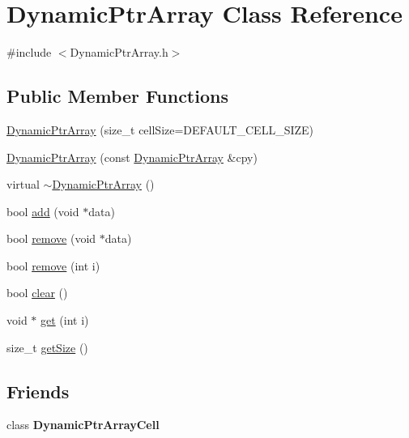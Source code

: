 \hypertarget{class_dynamic_ptr_array}{\section{Dynamic\+Ptr\+Array Class Reference}
\label{class_dynamic_ptr_array}
}


{\ttfamily \#include $<$Dynamic\+Ptr\+Array.\+h$>$}

\subsection*{Public Member Functions}
\begin{DoxyCompactItemize}
\item 
\hyperlink{class_dynamic_ptr_array_a57b0166ab9e49562247106cbaca00eb1}{Dynamic\+Ptr\+Array} (size\+\_\+t cell\+Size=D\+E\+F\+A\+U\+L\+T\+\_\+\+C\+E\+L\+L\+\_\+\+S\+I\+Z\+E)
\item 
\hyperlink{class_dynamic_ptr_array_a73f3b88933927871159cf56ea9c68d39}{Dynamic\+Ptr\+Array} (const \hyperlink{class_dynamic_ptr_array}{Dynamic\+Ptr\+Array} \&cpy)
\item 
virtual \hyperlink{class_dynamic_ptr_array_a075c62d5548fc344033a2a401e5593e0}{$\sim$\+Dynamic\+Ptr\+Array} ()
\item 
bool \hyperlink{class_dynamic_ptr_array_a10474d69e5e4d916c217f2cb4f1fdf79}{add} (void $\ast$data)
\item 
bool \hyperlink{class_dynamic_ptr_array_a1da46005c26dd7d4723ed1535a73d62f}{remove} (void $\ast$data)
\item 
bool \hyperlink{class_dynamic_ptr_array_af7d232f327b4bbd2ec3a9d886edc2907}{remove} (int i)
\item 
bool \hyperlink{class_dynamic_ptr_array_ad08021e4d8bfdc8235499e7b0948b2f0}{clear} ()
\item 
void $\ast$ \hyperlink{class_dynamic_ptr_array_a7e8eca98f7a6400614c6e2296735a956}{get} (int i)
\item 
size\+\_\+t \hyperlink{class_dynamic_ptr_array_a57608e634402b3e16048ad2c1c26e74e}{get\+Size} ()
\end{DoxyCompactItemize}
\subsection*{Friends}
\begin{DoxyCompactItemize}
\item 
\hypertarget{class_dynamic_ptr_array_a42b96309e3e1ad24f130cb1cd87f8c61}{class {\bfseries Dynamic\+Ptr\+Array\+Cell}}\label{class_dynamic_ptr_array_a42b96309e3e1ad24f130cb1cd87f8c61}

\end{DoxyCompactItemize}



